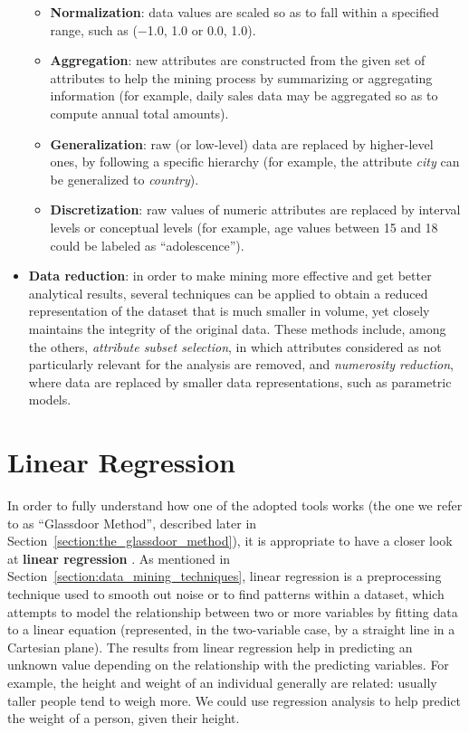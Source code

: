 \begin{itemize}
\begin{itemize}
\item \textbf{Normalization}: data values are scaled so as to fall within a specified range, such as (\(-\)1.0, 1.0 or 0.0, 1.0).
\item \textbf{Aggregation}: new attributes are constructed from the given set of attributes to help the mining process by summarizing or aggregating information (for example, daily sales data may be aggregated so as to compute annual total amounts).
\item \textbf{Generalization}: raw (or low-level) data are replaced by higher-level ones, by following a specific hierarchy (for example, the attribute \textit{city} can be generalized to \textit{country}).
\item \textbf{Discretization}: raw values of numeric attributes are replaced by interval levels or conceptual levels (for example, age values between 15 and 18 could be labeled as ``adolescence'').
\end{itemize}
\item \textbf{Data reduction}: in order to make mining more effective and get better analytical results, several techniques can be applied to obtain a reduced representation of the dataset that is much smaller in volume, yet closely maintains the integrity of the original data. These methods include, among the others, \textit{attribute subset selection}, in which attributes considered as not particularly relevant for the analysis are removed, and \textit{numerosity reduction}, where data are replaced by smaller data representations, such as parametric models.
\end{itemize}


\section{Linear Regression}
\label{section:linear_regression}
In order to fully understand how one of the adopted tools works (the one we refer to as ``Glassdoor Method'', described later in Section~\ref{section:the_glassdoor_method}), it is appropriate to have a closer look at \textbf{linear regression} \cite{glasserman2001linear}. As mentioned in Section~\ref{section:data_mining_techniques}, linear regression is a preprocessing technique used to smooth out noise or to find patterns within a dataset, which attempts to model the relationship between two or more variables by fitting data to a linear equation (represented, in the two-variable case, by a straight line in a Cartesian plane). The results from linear regression help in predicting an unknown value depending on the relationship with the predicting variables. For example, the height and weight of an individual generally are related: usually taller people tend to weigh more. We could use regression analysis to help predict the weight of a person, given their height.

